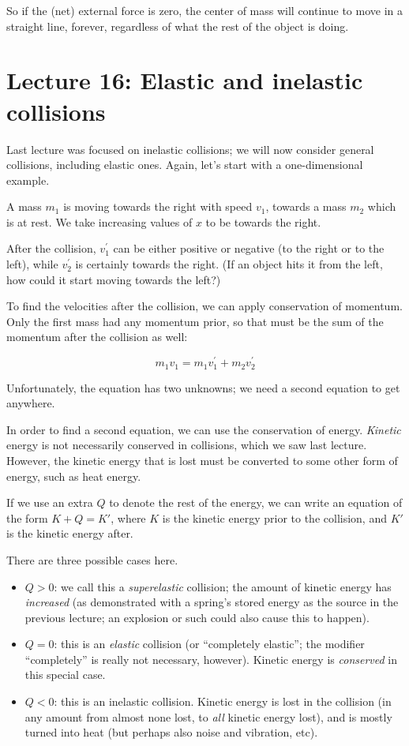 \documentclass[12pt,a4paper]{report}
\begin{document}
So if the (net) external force is zero, the center of mass will continue to move in a straight line, forever, regardless of what the rest of the object is doing.

\section{Lecture 16: Elastic and inelastic collisions}

Last lecture was focused on inelastic collisions; we will now consider general collisions, including elastic ones. Again, let's start with a one-dimensional example.

A mass $m_1$ is moving towards the right with speed $v_1$, towards a mass $m_2$ which is at rest. We take increasing values of $x$ to be towards the right.

After the collision, $v_1^{'}$ can be either positive or negative (to the right or to the left), while $v_2^{'}$ is certainly towards the right. (If an object hits it from the left, how could it start moving towards the left?)

To find the velocities after the collision, we can apply conservation of momentum. Only the first mass had any momentum prior, so that must be the sum of the momentum after the collision as well:

\begin{equation}
m_1 v_1 = m_1 v_1^{'} + m_2 v_2^{'}
\end{equation}

Unfortunately, the equation has two unknowns; we need a second equation to get anywhere.

In order to find a second equation, we can use the conservation of energy. \emph{Kinetic} energy is not necessarily conserved in collisions, which we saw last lecture. However, the kinetic energy that is lost must be converted to some other form of energy, such as heat energy.

If we use an extra $Q$ to denote the rest of the energy, we can write an equation of the form $K + Q = K'$, where $K$ is the kinetic energy prior to the collision, and $K'$ is the kinetic energy after.

There are three possible cases here.

\begin{itemize}
\item $Q > 0$: we call this a \emph{superelastic} collision; the amount of kinetic energy has \emph{increased} (as demonstrated with a spring's stored energy as the source in the previous lecture; an explosion or such could also cause this to happen).
\item $Q = 0$: this is an \emph{elastic} collision (or ``completely elastic''; the modifier ``completely'' is really not necessary, however). Kinetic energy is \emph{conserved} in this special case.
\item $Q < 0$: this is an inelastic collision. Kinetic energy is lost in the collision (in any amount from almost none lost, to \emph{all} kinetic energy lost), and is mostly turned into heat (but perhaps also noise and vibration, etc).
\end{itemize}
\end{document}
